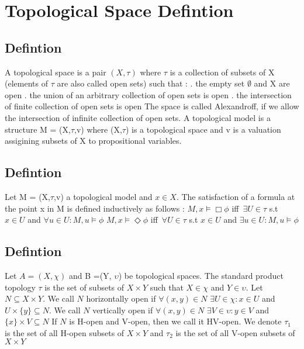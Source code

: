\documentclass[12pt, a4paper]{scrreprt}
\begin{document}
\chapter{Topological Space Defintion}

\section{Defintion}

A topological space is a pair $(X, \tau)$ where $\tau$ is a collection of subsets of X (elements of $\tau$ are also called open sets) such that : 
\newline
{}. the empty set $\emptyset $ and X are open
. the union of an arbitrary collection of open sets is open
. the intersection of finite collection of open sets is open
\newline
\newline
The space is called Alexandroff, if we allow the intersection of infinite collection of open sets.
A topological model is a structure M = (X,$\tau$,v) where (X,$\tau$) is a topological space
and v is a valuation assigining subsets of X to propositional variables. 

\section{Defintion}
Let M = (X,$\tau$,v) a topological model and $x \in X$. The satisfaction of a formula
at the point x in M is defined inductively as follows :
\newline
$M,x \models \Box \phi$ iff $\, \exists U \in \tau$ s.t $x \in U$ and $\forall u \in U : M,u \models \phi$
\newline
$M,x \models \Diamond \phi$ iff $\, \forall U \in \tau$ s.t $x \in U$ and $\exists u \in U : M,u \models \phi$

\section{Defintion}
Let $A = (X, \chi)$ and B =(Y, $\upsilon$) be topological spaces. The standard product topology $\tau$ is the set of subsets of 
$X \times Y$ such that $X \in \chi$ and $Y \in \upsilon$. \newline
Let $N \subseteq X \times Y $. We call $N$ horizontally open if $\forall (x,y) \in N $ $\exists U \in \chi : x \in U $ and $ U \times \{ y \} \subseteq N$. \newline We call $N$ 
vertically open if $\forall (x,y) \in N$ $\exists V \in \upsilon : y \in V$ and  $ \{ x \} \times V \subseteq N$ \newline
If $N$ is H-open and V-open, then we call it HV-open. \newline
We denote $\tau_1$ is the set of all H-open subsets of $X \times Y$ and $\tau_2$ is the set of all V-open subsets of $X\times Y$
\end{document}
